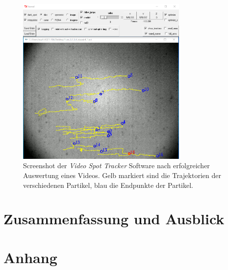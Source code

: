 \documentclass[page,pdftex,12pt,a4paper,twoside,openright]{scrbook}
\begin{document}
\begin{figure}[h]
\centering
\includegraphics[width=0.75\textwidth]{./img/videospottracker.png}
\caption{\label{img-videospottracker}
Screenshot der \emph{Video Spot Tracker} Software nach erfolgreicher Auswertung eines Videos. Gelb markiert sind die Trajektorien der verschiedenen Partikel, blau die Endpunkte der Partikel.}
\end{figure}
\chapter{Zusammenfassung und Ausblick \label{sec-zusammenfassung}}
\label{sec:org7b67d74}
\chapter{Anhang}
\label{sec:org5aeee95}
\end{document}
